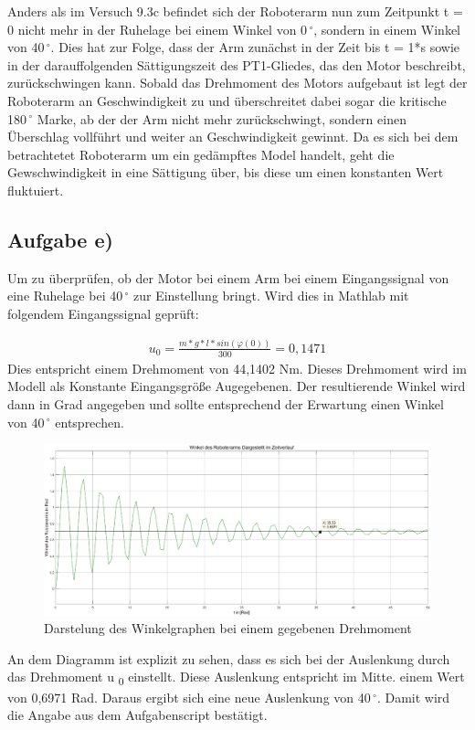 \documentclass[10pt]{scrartcl}
\begin{document}
Anders als im Versuch 9.3c befindet sich der Roboterarm nun zum Zeitpunkt
t = 0 nicht mehr in der Ruhelage bei einem Winkel von 0\,$^\circ$, sondern in einem 
Winkel von 40\,$^\circ$. Dies hat zur Folge, dass der Arm zunächst 
in der Zeit bis t = 1*s
sowie in der darauffolgenden Sättigungszeit des PT1-Gliedes,
das den Motor beschreibt, zurückschwingen kann.
Sobald das Drehmoment des Motors aufgebaut ist legt der Roboterarm 
an Geschwindigkeit zu und überschreitet dabei sogar die kritische 180\,$^\circ$
Marke, ab der der Arm nicht mehr zurückschwingt, sondern einen Überschlag
vollführt und weiter an Geschwindigkeit gewinnt.
Da es sich bei dem betrachtetet Roboterarm um ein gedämpftes Model
handelt, geht die Gewschwindigkeit in eine Sättigung über, bis diese um
einen konstanten Wert fluktuiert. 


\subsection{Aufgabe e)}
Um zu überprüfen, ob der Motor bei einem Arm bei einem Eingangssignal von eine Ruhelage bei 40\,$^\circ$ zur Einstellung bringt. Wird dies in Mathlab mit folgendem Eingangssignal geprüft:

\begin{align}
   u_0 = \frac{m*g*l* sin( \varphi (0))}{300} = 0,1471
\end{align}
Dies entspricht einem Drehmoment von 44,1402 Nm. Dieses Drehmoment wird im Modell als Konstante Eingangsgröße Augegebenen. Der resultierende Winkel wird dann in Grad angegeben und sollte entsprechend der Erwartung einen Winkel von 40\,$^\circ$ entsprechen.
\begin{figure}[H]
	\centering
	\includegraphics[width=1.2\textwidth]{Aufgabe9e}
	\caption{Darstelung des Winkelgraphen bei einem gegebenen Drehmoment}
	\label{img:grafik-dummy}
\end{figure}
An dem Diagramm ist explizit zu sehen, dass es sich bei der Auslenkung durch das Drehmoment u \textsubscript{0} einstellt. Diese Auslenkung entspricht im Mitte. einem Wert von 0,6971 Rad. Daraus ergibt sich eine neue Auslenkung von 40\,$^\circ$. Damit wird die Angabe aus dem Aufgabenscript bestätigt.
\end{document}
